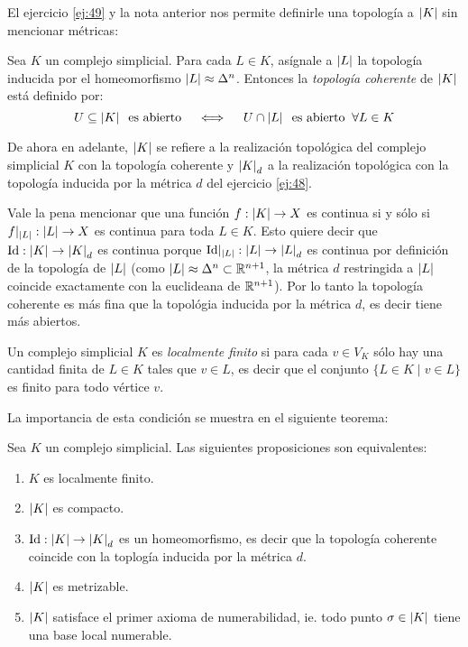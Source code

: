 \documentclass[../../topologia_algebraica]{subfiles}
\begin{document}
El ejercicio \ref{ej:49} y la nota anterior nos permite definirle una topolog\'ia a $\left| K \right|$ sin
mencionar m\'etricas:

\begin{defin}
  Sea $K$ un complejo simplicial. Para cada $L\in K$, as\'ignale a $\left| L \right|$ la topolog\'ia
  inducida por el homeomorfismo $\left| L \right|\approx\Delta^n$. Entonces la \emph{topolog\'ia coherente}
  de $\left| K \right|$ est\'a definido por:
  \[
    U\subseteq\left| K \right|\;\;\text{es abierto} \quad\iff\quad
    U\cap\left| L \right|\;\;\text{es abierto}\;\;\forall L\in K
  \]
\end{defin}

\begin{nota}
  De ahora en adelante, $\left| K \right|$ se refiere a la realizaci\'on topol\'ogica del complejo simplicial
  $K$ con la topolog\'ia coherente y $\left| K \right|_d$ a la realizaci\'on topol\'ogica con la topolog\'ia
  inducida por la m\'etrica $d$ del ejercicio \ref{ej:48}.
\end{nota}

\begin{nota}
  Vale la pena mencionar que una funci\'on $f:\left| K \right|\rightarrow X$ es continua si y s\'olo si
  $f|_{\left| L \right|}:\left| L \right|\rightarrow X$ es continua para toda $L\in K$. Esto quiere decir que
  $\text{Id}:\left| K \right|\rightarrow\left| K \right|_d$ es continua porque $\text{Id}|_{\left| L \right|}:\left| L \right|\rightarrow\left| L \right|_d$ es continua por
  definici\'on de la topolog\'ia de $\left| L \right|$ (como $\left| L \right|\approx\Delta^n\subset\mathbb{R}^{n+1}$, la
  m\'etrica $d$ restringida a $\left| L \right|$ coincide exactamente con la euclideana de $\mathbb{R}^{n+1}$).
  Por lo tanto la topolog\'ia coherente es m\'as fina que la topol\'ogia inducida por la m\'etrica
  $d$, es decir tiene m\'as abiertos.
\end{nota}

\begin{defin}
  Un complejo simplicial $K$ es \emph{localmente finito} si para cada $v\in V_K$ s\'olo hay una
  cantidad finita de $L\in K$ tales que $v\in L$, es decir que el conjunto $\{L\in K\mid v\in L\}$
  es finito para todo v\'ertice $v$.
\end{defin}
 
La importancia de esta condici\'on se muestra en el siguiente teorema:

\begin{thm}
  Sea $K$ un complejo simplicial. Las siguientes proposiciones son equivalentes:
  \begin{enumerate}
  \item $K$ es localmente finito.
  \item $\left| K \right|$ es compacto.
  \item $\text{Id}:\left| K \right|\rightarrow\left| K \right|_d$ es un homeomorfismo, es decir que la topolog\'ia coherente
    coincide con la toplog\'ia inducida por la m\'etrica $d$.
  \item $\left| K \right|$ es metrizable.
  \item $\left| K \right|$ satisface el primer axioma de numerabilidad, ie. todo punto $\sigma\in\left| K \right|$
    tiene una base local numerable.
  \end{enumerate}
\end{thm}
\end{document}
